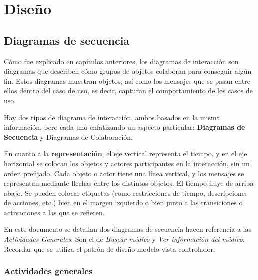 \documentclass[a4paper,oneside,11pt]{book}
\begin{document}
	
\chapter{Diseño} %
\label{cha:diseno}


	\section{Diagramas de secuencia} %
	\label{sec:diagramas_de_secuencia}
	
		Cómo fue explicado en capítulos anteriores, los diagramas de interacción son diagramas que describen cómo grupos de objetos colaboran para conseguir algún fin. Estos diagramas muestran objetos, así como los mensajes que se pasan entre ellos dentro del caso de uso, es decir, capturan el comportamiento de los casos de uso.
		
		Hay dos tipos de diagrama de interacción, ambos basados en la misma información, pero cada uno enfatizando un aspecto particular: \textbf{Diagramas de Secuencia} y Diagramas de Colaboración.
	
		\medskip
		
		
		\medskip
		
		En cuanto a la \textbf{representación}, el eje vertical representa el tiempo, y en el eje horizontal se colocan los objetos y actores participantes en la interacción, sin un orden prefijado. Cada objeto o actor tiene una línea vertical, y los mensajes se representan mediante flechas entre los distintos objetos. El tiempo fluye de arriba abajo. Se pueden colocar etiquetas (como restricciones de tiempo, descripciones de acciones, etc.) bien en el margen izquierdo o bien junto a las transiciones o activaciones a las que se refieren. 
		
		En este documento se detallan dos diagramas de secuencia hacen referencia a las \textit{Actividades Generales}. Son el de \textit{Buscar médico} y \textit{Ver información del médico.} Recordar que se utiliza el patrón de diseño modelo-vista-controlador.

		\newpage
		\subsection{Actividades generales} %
		\label{sub:actividades_generales}
		
\end{document}
